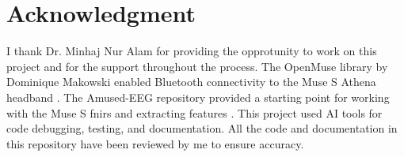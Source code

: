 \documentclass[conference]{IEEEtran}
\begin{document}
\section*{Acknowledgment}

I thank Dr. Minhaj Nur Alam for providing the opprotunity to work on this project and for the support throughout the process. The OpenMuse library by Dominique Makowski enabled Bluetooth connectivity to the Muse S Athena headband \cite{b8}. The Amused-EEG repository provided a starting point for working with the Muse S fnirs and extracting features \cite{b6}. This project used AI tools for code debugging, testing, and documentation. All the code and documentation in this repository have been reviewed by me to ensure accuracy.
\end{document}
